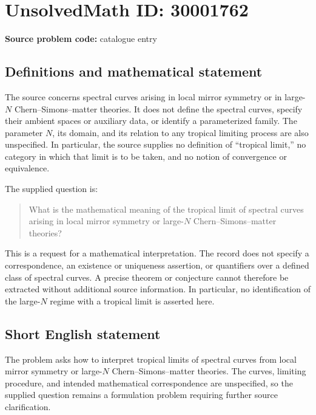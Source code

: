 \documentclass[11pt]{article}
\begin{document}
\section*{UnsolvedMath ID: 30001762}
\textbf{Source problem code:} catalogue entry
\subsection{Definitions and mathematical statement}
The source concerns spectral curves arising in local mirror symmetry or in large-\(N\) Chern--Simons--matter theories. It does not define the spectral curves, specify their ambient spaces or auxiliary data, or identify a parameterized family. The parameter \(N\), its domain, and its relation to any tropical limiting process are also unspecified. In particular, the source supplies no definition of ``tropical limit,'' no category in which that limit is to be taken, and no notion of convergence or equivalence.

The supplied question is:
\begin{quote}
What is the mathematical meaning of the tropical limit of spectral curves arising in local mirror symmetry or large-\(N\) Chern--Simons--matter theories?
\end{quote}
This is a request for a mathematical interpretation. The record does not specify a correspondence, an existence or uniqueness assertion, or quantifiers over a defined class of spectral curves. A precise theorem or conjecture cannot therefore be extracted without additional source information. In particular, no identification of the large-\(N\) regime with a tropical limit is asserted here.
\subsection{Short English statement}
The problem asks how to interpret tropical limits of spectral curves from local mirror symmetry or large-\(N\) Chern--Simons--matter theories. The curves, limiting procedure, and intended mathematical correspondence are unspecified, so the supplied question remains a formulation problem requiring further source clarification.
\end{document}

